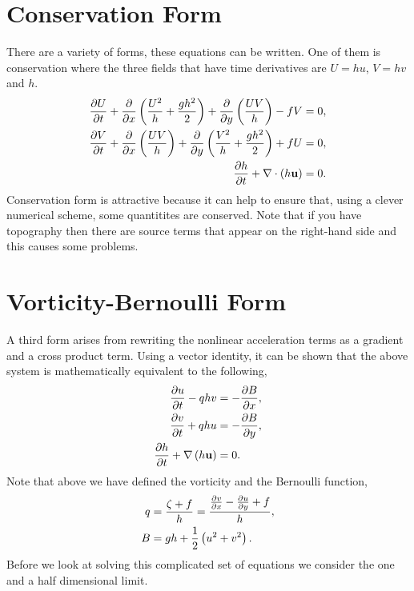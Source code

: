 \documentclass[letterpaper,10pt,english]{sphinxmanual}
\begin{document}
\section{Conservation Form}
\label{sw_intro:conservation-form}
There are a variety of forms, these equations can be written. One of
them is conservation where the three fields that have time derivatives
are \(U = hu\), \(V = hv\) and \(h\).
\begin{gather}
\begin{split}\begin{aligned}
\frac{\partial U}{\partial t}
+ \frac{\partial}{\partial x}\left( \frac{U^2}{h} + \frac{g h^2}{2} \right)
+ \frac{\partial}{\partial y}\left( \frac{U V}{h}  \right)
- f V
&= 0,\\
\frac{\partial V}{\partial t}
+ \frac{\partial}{\partial x}\left( \frac{U V}{h}  \right)
+ \frac{\partial}{\partial y}\left( \frac{V^2}{h} + \frac{g h^2}{2} \right)
+ f U
&= 0,\\
\frac{\partial h}{\partial t} + \nabla \cdot \left( h \bf{u} \right) &= 0.\end{aligned}\end{split}\notag
\end{gather}
Conservation form is attractive because it can help to ensure that,
using a clever numerical scheme, some quantitites are conserved. Note
that if you have topography then there are source terms that appear on
the right-hand side and this causes some problems.


\section{Vorticity-Bernoulli Form}
\label{sw_intro:vorticity-bernoulli-form}
A third form arises from rewriting the nonlinear acceleration terms as a
gradient and a cross product term. Using a vector identity, it can be
shown that the above system is mathematically equivalent to the
following,
\begin{gather}
\begin{split}\begin{aligned}
\frac{\partial u}{\partial t}  - q h v
&= - \frac{\partial B}{\partial x},\\
\frac{\partial v}{\partial t}  + q h u
&= - \frac{\partial B}{\partial y},\\
\frac{\partial h}{\partial t} + \nabla \left( h \bf{u} \right) &= 0.\end{aligned}\end{split}\notag
\end{gather}
Note that above we have defined the vorticity and the Bernoulli
function,
\begin{gather}
\begin{split}\begin{aligned}
q &= \frac{\zeta + f}{h}
 = \frac{\frac{\partial v}{\partial x} - \frac{\partial u}{\partial y} + f}{h},\\
B & = g h + \frac12 \left( u^2 + v^2 \right).\end{aligned}\end{split}\notag
\end{gather}
Before we look at solving this complicated set of equations we consider
the one and a half dimensional limit.
\end{document}
